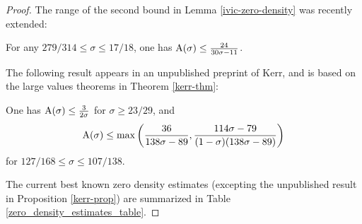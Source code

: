\begin{proof}
The range of the second bound in Lemma \ref{ivic-zero-density} was recently extended:

\begin{theorem}\label{cdv-density}\cite{chen_debruyne_vindas_density_2024}  For any $279/314 \leq \sigma \leq 17/18$, one has $\mathrm{A}(\sigma) \leq \frac{24}{30\sigma-11}$.
\end{theorem}
\literature
{}

The following result appears in an unpublished preprint of Kerr, and is based on the large values theorems in Theorem \ref{kerr-thm}:

\begin{proposition}\label{kerr-prop}\cite[Theorems 6, 7]{kerr} One has $\mathrm{A}(\sigma) \leq \frac{3}{2\sigma}$ for $\sigma \geq 23/29$, and
$$\mathrm{A}(\sigma) \leq \max\left( \frac{36}{138\sigma-89}, \frac{114\sigma-79}{(1-\sigma)(138\sigma-89)} \right)$$
for $127/168 \leq \sigma \leq 107/138$.
\end{proposition}

The current best known zero density estimates (excepting the unpublished result in Proposition \ref{kerr-prop}) are summarized in Table \ref{zero_density_estimates_table}.

\derived
{}


\end{proof}
